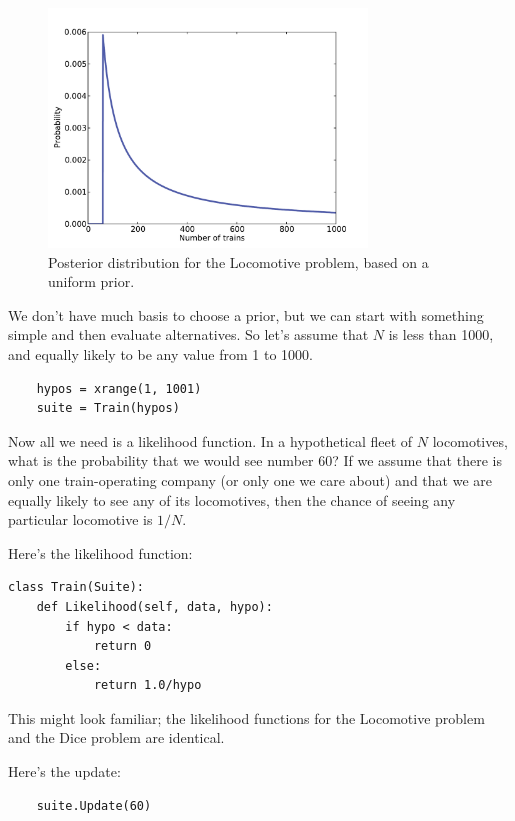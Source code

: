 \documentclass[12pt]{book}
\begin{document}
\begin{figure}
\centerline{\includegraphics[height=2.5in]{figs/train1.pdf}}
\caption{Posterior distribution for the Locomotive problem, based
on a uniform prior.}
\label{fig.train1}
\end{figure}

We don't have much basis to choose a prior, but we can
start with something simple and
then evaluate alternatives.  So let's assume that $N$ is less
than 1000, and equally likely to be any value from 1 to 1000.

\begin{verbatim}
    hypos = xrange(1, 1001)
    suite = Train(hypos)
\end{verbatim}

Now all we need is a likelihood function.  In a hypothetical fleet of
$N$ locomotives, what is the probability that we would see number 60?
If we assume that there is only one train-operating company (or only
one we care about) and that we are equally likely to see any of its
locomotives, then the chance of seeing any particular locomotive is
$1/N$.

Here's the likelihood function:

\begin{verbatim}
class Train(Suite):
    def Likelihood(self, data, hypo):
        if hypo < data:
            return 0
        else:
            return 1.0/hypo
\end{verbatim}

This might look familiar; the likelihood functions for the Locomotive
problem and the Dice problem are identical.

Here's the update:

\begin{verbatim}
    suite.Update(60)
\end{verbatim}
\end{document}
